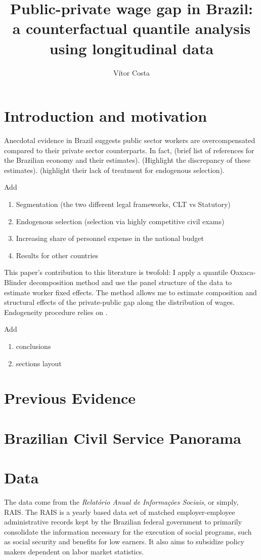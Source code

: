 \documentclass{article}
\title{Public-private wage gap in Brazil: a counterfactual quantile analysis using longitudinal data}
\author{Vítor Costa}
\date
\begin{document}
\maketitle
\tableofcontents

\section{Introduction and motivation}
Anecdotal evidence in Brazil suggests public sector workers are overcompensated compared to their private sector counterparts. In fact, (brief list of references for the Brazilian economy and their estimates). (Highlight the discrepancy of these estimates). (highlight their lack of treatment for endogenous selection).

Add
\begin{enumerate}
    \item Segmentation (the two different legal frameworks, CLT vs Statutory)
    \item Endogenous selection (selection via highly competitive civil exams)
    \item Increasing share of personnel expense in the national budget 
    \item Results for other countries
\end{enumerate}


This paper's contribution to this literature is twofold: I apply a quantile Oaxaca-Blinder decomposition method and use the panel structure of the data to estimate worker fixed effects. The method allows me to estimate composition and structural effects of the private-public gap along the distribution of wages. Endogeneity procedure relies on \cite{canay_simple_2011}.  

Add 
\begin{enumerate}
    \item conclusions
    \item sections layout 
\end{enumerate}

\section{Previous Evidence}\label{section:lit-review}

\section{Brazilian Civil Service Panorama}

\section{Data}
The data come from the \emph{Relatório Anual de Informações Sociais}, or simply, RAIS. The RAIS is a yearly based data set of matched employer-employee administrative records kept by the Brazilian federal government to primarily consolidate the information necessary for the execution of social programs, such as social security and benefits for low earners. It also aims to subsidize policy makers dependent on labor market statistics. \\
\end{document}
